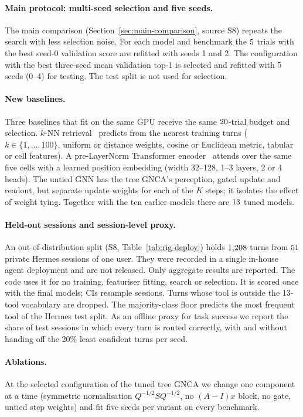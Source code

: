 \documentclass[10pt,twocolumn,letterpaper]{article}
\begin{document}
\paragraph{Main protocol: multi-seed selection and five seeds.} The main comparison (Section~\ref{sec:main-comparison}, source S8) repeats the search with less selection noise. For each model and benchmark the $5$ trials with the best seed-0 validation score are refitted with seeds 1 and 2. The configuration with the best three-seed mean validation top-1 is selected and refitted with $5$ seeds (0--4) for testing. The test split is not used for selection.
\paragraph{New baselines.} Three baselines that fit on the same GPU receive the same $20$-trial budget and selection. $k$-NN retrieval~\cite{cover1967nearest} predicts from the nearest training turns ($k\in\{1,\dots,100\}$, uniform or distance weights, cosine or Euclidean metric, tabular or cell features). A pre-LayerNorm Transformer encoder~\cite{vaswani2017attention} attends over the same five cells with a learned position embedding (width 32--128, 1--3 layers, 2 or 4 heads). The untied GNN has the tree GNCA's perception, gated update and readout, but separate update weights for each of the $K$ steps; it isolates the effect of weight tying. Together with the ten earlier models there are $13$ tuned models.
\paragraph{Held-out sessions and session-level proxy.} An out-of-distribution split (S8, Table~\ref{tab:rig-deploy}) holds $1{,}208$ turns from $51$ private Hermes sessions of one user. They were recorded in a single in-house agent deployment and are not released. Only aggregate results are reported. The code uses it for no training, featuriser fitting, search or selection. It is scored once with the final models; CIs resample sessions. Turns whose tool is outside the 13-tool vocabulary are dropped. The majority-class floor predicts the most frequent tool of the Hermes test split. As an offline proxy for task success we report the share of test sessions in which every turn is routed correctly, with and without handing off the 20\% least confident turns per seed.
\paragraph{Ablations.} At the selected configuration of the tuned tree GNCA we change one component at a time (symmetric normalisation $Q^{-1/2}SQ^{-1/2}$, no $(A{-}I)x$ block, no gate, untied step weights) and fit five seeds per variant on every benchmark.
\end{document}
